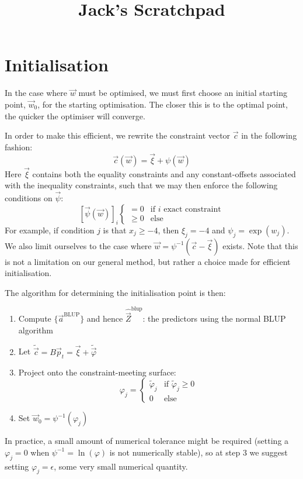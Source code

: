 \documentclass[]{article}
\title{Jack's Scratchpad}
\begin{document}
	\maketitle
	\tableofcontents
	\section{Initialisation}

		In the case where $\vec{w}$ must be optimised, we must first choose an initial starting point, $\vec{w}_0$, for the starting optimisation. The closer this is to the optimal point, the quicker the optimiser will converge.

		In order to make this efficient, we rewrite the constraint vector $\vec{c}$ in the following fashion:
		\begin{equation}
			\vec{c}(\vec{w}) = \vec{\xi} + \psi(\vec{w})
		\end{equation}
		Here $\vec{\xi}$ contains both the equality constraints and any constant-offsets associated with the inequality constraints, such that we may then enforce the following conditions on $\vec{\psi}$:
		\begin{equation}
			\left[ \vec{\psi}(\vec{w}) \right]_i  \begin{cases}
					= 0 & \text{if $i$ exact constraint}
					\\
					\geq 0 & \text{else}
				\end{cases}
		\end{equation}
		For example, if condition $j$ is that $x_j \geq -4$, then $\xi_j = -4$ and $\psi_j = \exp(w_j)$. We also limit ourselves to the case where $\vec{w} = \psi^{-1}(\vec{c} - \vec{\xi})$ exists. Note that this is not a limitation on our general method, but rather a choice made for efficient initialisation.

		The algorithm for determining the initialisation point is then:
		\begin{enumerate}
			\item Compute $\{ \vec{a}^\text{BLUP} \}$ and hence $\hat{\vec{Z}}^\text{blup}$: the predictors using the normal BLUP algorithm
			\item Let $\tilde{\vec{c}} = B \vec{p}_t = \vec{\xi} + \tilde{\vec{\varphi}}$
			\item Project onto the constraint-meeting surface:
			$$ \varphi_j = \begin{cases} \tilde{\varphi}_j & \text{if } \tilde{\varphi}_j \geq 0
				\\
				0 & \text{else} \end{cases}$$
			\item Set $\vec{w}_0 = \psi^{-1}\left(\varphi_j\right)$
		\end{enumerate}
		In practice, a small amount of numerical tolerance might be required (setting a $\varphi_j =0$ when $\psi^{-1} = \ln(\varphi)$ is not numerically stable), so at step 3 we suggest setting $\varphi_j = \epsilon$, some very small numerical quantity.
\end{document}
